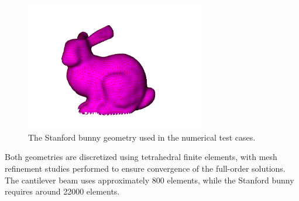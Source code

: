 \begin{figure}[H]
    \centering
    \includegraphics[width=0.7\textwidth]{Images/stanford_bunny.png}
    \caption{The Stanford bunny geometry used in the numerical test cases.}
    \label{fig:stanford_bunny}
    \end{figure}

Both geometries are discretized using tetrahedral finite elements, with mesh refinement studies performed to ensure convergence of the full-order solutions. The cantilever beam uses approximately 800 elements, while the Stanford bunny requires around 22000 elements.

